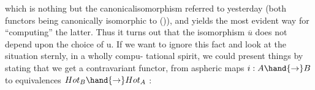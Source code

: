 which is nothing but the canonicalisomorphism referred to yesterday
\margin{(*)} (both functors being canonically isomorphic to ()), and yields the
most evident way for ``computing'' the latter. Thus it turns out that
the isomorphism $\overline{u}$ does not depend upon the choice of u. If we want
to ignore this fact and look at the situation sternly, in a wholly compu-%
tational spirit, we could present things by stating that we get a
contravariant functor, from aspheric maps $i: A \hand{\to} B$ to equivalences
$Hot_B \hand{\to} Hot_A$ :
